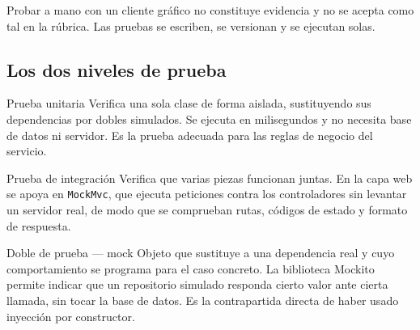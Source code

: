 \documentclass[11pt,a4paper,openany]{book}
\begin{document}
Probar a mano con un cliente gráfico no constituye evidencia y no se acepta como tal en la rúbrica. Las pruebas se escriben, se versionan y se ejecutan solas.

\subsection{Los dos niveles de prueba}
\label{sec:niveles-prueba}

\begin{cajadefinicion}{Prueba unitaria}
	Verifica una sola clase de forma aislada, sustituyendo sus dependencias por dobles simulados. Se ejecuta en milisegundos y no necesita base de datos ni servidor. Es la prueba adecuada para las reglas de negocio del servicio.
\end{cajadefinicion}

\begin{cajadefinicion}{Prueba de integración}
	Verifica que varias piezas funcionan juntas. En la capa web se apoya en \texttt{MockMvc}, que ejecuta peticiones contra los controladores sin levantar un servidor real, de modo que se comprueban rutas, códigos de estado y formato de respuesta.
\end{cajadefinicion}

\begin{cajadefinicion}{Doble de prueba --- mock}
	Objeto que sustituye a una dependencia real y cuyo comportamiento se programa para el caso concreto. La biblioteca Mockito permite indicar que un repositorio simulado responda cierto valor ante cierta llamada, sin tocar la base de datos. Es la contrapartida directa de haber usado inyección por constructor.
\end{cajadefinicion}
\end{document}
